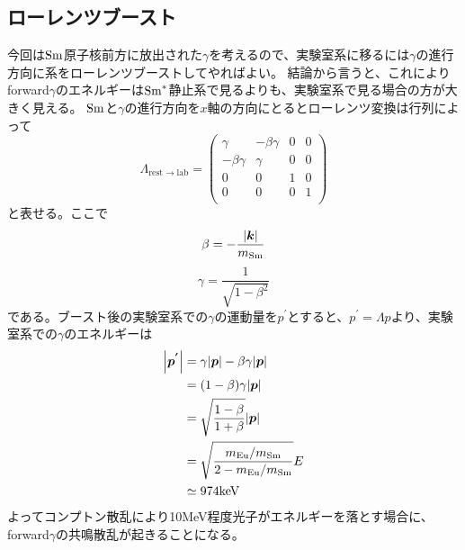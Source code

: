 \documentclass[dvipdfmx]{jreport}
\begin{document}
\subsection{ローレンツブースト}
今回は$\ce{Sm}$原子核前方に放出された$\gamma$を考えるので、実験室系に移るには$\gamma$の進行方向に系をローレンツブーストしてやればよい。
結論から言うと、これによりforward$\gamma$のエネルギーは$\ce{Sm^{*}}$静止系で見るよりも、実験室系で見る場合の方が大きく見える。
$\ce{Sm}$と$\gamma$の進行方向を$x$軸の方向にとるとローレンツ変換は行列によって
\begin{equation}
  \Lambda_{\mathrm{rest} \rightarrow \mathrm{lab}} =
  \begin{pmatrix}
    \gamma & -\beta \gamma & 0 & 0\\
    -\beta \gamma & \gamma & 0 & 0\\
    0 & 0 & 1 & 0\\
    0 & 0 & 0 & 1\\
  \end{pmatrix}
\end{equation}
と表せる。ここで
\begin{equation}
  \beta = -\frac{\abs{\boldsymbol{k}}}{m_{\mathrm{Sm}}}
\end{equation}
\begin{equation}
  \gamma = \frac{1}{\sqrt{1 - \beta^{2}}}
\end{equation}
である。ブースト後の実験室系での$\gamma$の運動量を$p^{'}$とすると、$p^{'} = \Lambda p$より、実験室系での$\gamma$のエネルギーは
\begin{equation}
  \begin{split}
  \abs{\boldsymbol{p^{'}}} &= \gamma \abs{\boldsymbol{p}} - \beta \gamma \abs{\boldsymbol{p}}\\
  &= (1 - \beta) \gamma \abs{\boldsymbol{p}}\\
  &= \sqrt{\frac{1 - \beta}{1 + \beta}} \abs{\boldsymbol{p}}\\
  &= \sqrt{\frac{ m_{\mathrm{Eu}} / m_{\mathrm{Sm}} }{ 2 -  m_{\mathrm{Eu}} / m_{\mathrm{Sm}} }} E\\
  &\simeq 974\mathrm{keV}
  \end{split}
\end{equation}
よってコンプトン散乱により10MeV程度光子がエネルギーを落とす場合に、forward$\gamma$の共鳴散乱が起きることになる。
\end{document}
